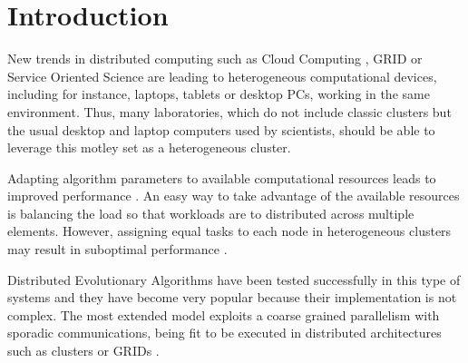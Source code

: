 \documentclass[final,1p,times]{elsarticle}
\begin{document}
\section{Introduction}
\label{sec:intro}




New trends in distributed computing such as Cloud Computing \cite{CLOUD}, GRID
\cite{OPENSCIENCEGRID} or Service Oriented Science \cite{GLOBUS} are
leading to heterogeneous computational devices, including for instance, laptops,
tablets or desktop PCs, working in the same
environment. Thus, many laboratories, which do not include classic
clusters but the usual desktop and laptop computers used by
scientists, should be able to leverage
this motley set as a heterogeneous cluster. 

Adapting algorithm parameters to available computational resources
leads to improved performance
\cite{AutomaticallyConfiguringStyles12}. An easy way to take advantage
of the available resources is  balancing the load
\cite{PARALLELIMPLEMENTATION} so that workloads are to distributed across multiple
elements. However, assigning equal tasks  to each node in
heterogeneous clusters may result in suboptimal performance
\cite{LoadBalancingBohn02}. 




Distributed Evolutionary
Algorithms \cite{MULTIKULTI,PARALLELGRIDHETEROGENEOUS} have been tested successfully in this
type of systems \cite{HETEROGENEOUSHARD} and they have become very popular because their implementation is
not complex.
The most extended model exploits a coarse grained parallelism with sporadic
 communications, being fit to be executed in distributed architectures
 such as clusters or GRIDs \cite{PLATO}.



\end{document}
